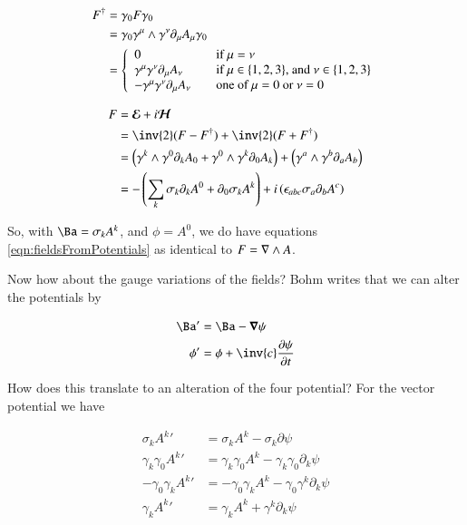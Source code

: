 \documentclass{article}
\newcommand{\EE}[0]{\boldsymbol{\mathcal{E}}}
\newcommand{\HH}[0]{\boldsymbol{\mathcal{H}}}
\begin{document}
\begin{align*}
F^\dagger &=\gamma_0 F \gamma_0 \\
&= \gamma_0 \gamma^\mu \wedge \gamma^\nu \partial_\mu A_\mu \gamma_0 \\
&=
\left\{
\begin{array}{l l}
0 & \quad \mbox{if $\mu = \nu$} \\
\gamma^\mu \gamma^\nu \partial_\mu A_\nu & \quad \mbox{if $\mu \in \{1,2,3\}$, and $\nu \in \{1,2,3\}$} \\
-\gamma^\mu \gamma^\nu \partial_\mu A_\nu & \quad \mbox{one of $\mu = 0$ or $\nu = 0$ } \\
\end{array} \right.
\end{align*}

\begin{align*}
F 
&= \EE + i\HH \\
&= \inv{2}(F - F^\dagger) + \inv{2}(F + F^\dagger) \\
&= \left(\gamma^k \wedge \gamma^0 \partial_k A_0 +\gamma^0 \wedge \gamma^k \partial_0 A_k\right) + \left(\gamma^a \wedge \gamma^b \partial_a A_b\right) \\
&= -\left(\sum_k \sigma_k \partial_k A^0 + \partial_0 \sigma_k A^k\right) + i\left(\epsilon_{abc}\sigma_a \partial_b A^c\right) \\
\end{align*}

So, with $\Ba = \sigma_k A^k$, and $\phi = A^0$, we do have equations \ref{eqn:fieldsFromPotentials} as identical to $F = \nabla \wedge A$.

Now how about the gauge variations of the fields?  Bohm writes that we can alter the potentials by

\begin{align}\label{eqn:gauge}
\Ba' &= \Ba - \spacegrad \psi \\
\phi' &= \phi + \inv{c}\PD{t}{\psi}
\end{align}

How does this translate to an alteration of the four potential?  For the vector potential we have

\begin{align*}
\sigma_k {A^k}' &= \sigma_k A^k - \sigma_k \partial \psi \\
\gamma_k \gamma_0 {A^k}' &= \gamma_k \gamma_0 A^k - \gamma_k \gamma_0 \partial_k \psi \\
-\gamma_0 \gamma_k {A^k}' &= -\gamma_0 \gamma_k A^k - \gamma_0 \gamma^k \partial_k \psi \\
\gamma_k {A^k}' &= \gamma_k A^k + \gamma^k \partial_k \psi \\
\end{align*}
\end{document}
